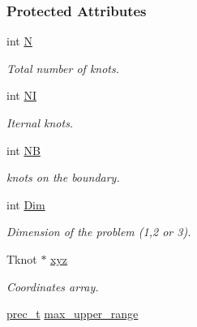 \subsubsection*{Protected Attributes}
\begin{CompactItemize}
\item 
\hypertarget{classKnots_0c51c67cde230cc6dac2f67e69ec435d}{
int \hyperlink{classKnots_0c51c67cde230cc6dac2f67e69ec435d}{N}}
\label{classKnots_0c51c67cde230cc6dac2f67e69ec435d}

\begin{CompactList}\small\item\em Total number of knots. \item\end{CompactList}\item 
\hypertarget{classKnots_aff81455ee299e6a5ac52e5ae8b8a19b}{
int \hyperlink{classKnots_aff81455ee299e6a5ac52e5ae8b8a19b}{NI}}
\label{classKnots_aff81455ee299e6a5ac52e5ae8b8a19b}

\begin{CompactList}\small\item\em Iternal knots. \item\end{CompactList}\item 
\hypertarget{classKnots_b4a3b83ef3088440209032288627ca00}{
int \hyperlink{classKnots_b4a3b83ef3088440209032288627ca00}{NB}}
\label{classKnots_b4a3b83ef3088440209032288627ca00}

\begin{CompactList}\small\item\em knots on the boundary. \item\end{CompactList}\item 
\hypertarget{classKnots_c2aa3335c3a2ec36cd24551d00f5e6d3}{
int \hyperlink{classKnots_c2aa3335c3a2ec36cd24551d00f5e6d3}{Dim}}
\label{classKnots_c2aa3335c3a2ec36cd24551d00f5e6d3}

\begin{CompactList}\small\item\em Dimension of the problem (1,2 or 3). \item\end{CompactList}\item 
\hypertarget{classKnots_43c6b23de91370c5c2006449a4dfdeee}{
Tknot $\ast$ \hyperlink{classKnots_43c6b23de91370c5c2006449a4dfdeee}{xyz}}
\label{classKnots_43c6b23de91370c5c2006449a4dfdeee}

\begin{CompactList}\small\item\em Coordinates array. \item\end{CompactList}\item 
\hypertarget{classKnots_1bbbdae7d38b43c4f78bf576bf705314}{
\hyperlink{Traits_8hpp_81f62fadeebafe942380746e380c72a5}{prec\_\-t} \hyperlink{classKnots_1bbbdae7d38b43c4f78bf576bf705314}{max\_\-upper\_\-range}}
\label{classKnots_1bbbdae7d38b43c4f78bf576bf705314}


\end{CompactItemize}
